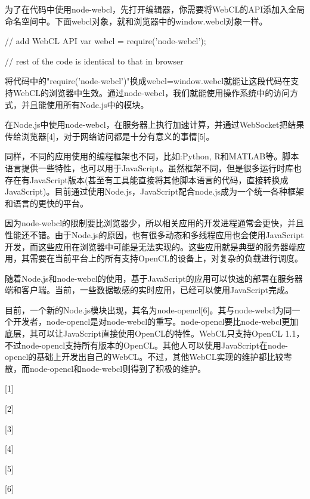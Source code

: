 为了在代码中使用node-webcl，先打开编辑器，你需要将WebCL的API添加入全局命名空间中。下面webcl对象，就和浏览器中的window.webcl对象一样。

\begin{codebox}[javascript]
// add WebCL API
var webcl = require('node-webcl');

// rest of the code is identical to that in browser
\end{codebox}

将代码中的"require('node-webcl')"换成webcl=window.webcl就能让这段代码在支持WebCL的浏览器中生效。通过node-webcl，我们就能使用操作系统中的访问方式，并且能使用所有Node.js中的模块。

在Node.js中使用node-webcl，在服务器上执行加速计算，并通过WebSocket把结果传给浏览器[4]，对于网络访问都是十分有意义的事情[5]。

同样，不同的应用使用的编程框架也不同，比如:Python, R和MATLAB等。脚本语言提供一些特性，也可以用于JavaScript。虽然框架不同，但是很多运行时库也存在有JavaScript版本(甚至有工具能直接将其他脚本语言的代码，直接转换成JavaScript)。目前通过使用Node.js，JavaScript配合node.js成为一个统一各种框架和语言的更快的平台。

因为node-webcl的限制要比浏览器少，所以相关应用的开发进程通常会更快，并且性能还不错。由于Node.js的原因，也有很多动态和多线程应用也会使用JavaScript开发，而这些应用在浏览器中可能是无法实现的。这些应用就是典型的服务器端应用，其需要在当前平台上的所有支持OpenCL的设备上，对复杂的负载进行调度。

随着Node.js和node-webcl的使用，基于JavaScript的应用可以快速的部署在服务器端和客户端。当前，一些数据敏感的实时应用，已经可以使用JavaScript完成。

目前，一个新的Node.js模块出现，其名为node-opencl[6]。其与node-webcl为同一个开发者，node-opencl是对node-webcl的重写。node-opencl要比node-webcl更加底层，其可以让JavaScript直接使用OpenCL的特性。WebCL只支持OpenCL 1.1，不过node-opencl支持所有版本的OpenCL。其他人可以使用JavaScript在node-opencl的基础上开发出自己的WebCL。不过，其他WebCL实现的维护都比较零散，而node-opencl和node-webcl则得到了积极的维护。

\myRefRule

\begin{myRefs}

[1] 

[2] 

[3] 

[4] 

[5] 

[6] 

\end{myRefs}



